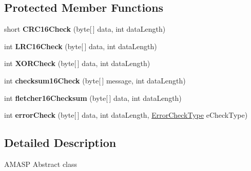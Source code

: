 \subsection*{Protected Member Functions}
\begin{DoxyCompactItemize}
\item 
\mbox{\label{class_a_m_a_s_p_java_1_1_a_m_a_s_p_serial_aaf3f716e38e188729ef100eb98cc7645}} 
short {\bfseries C\+R\+C16\+Check} (byte\mbox{[}$\,$\mbox{]} data, int data\+Length)
\item 
\mbox{\label{class_a_m_a_s_p_java_1_1_a_m_a_s_p_serial_a72d99f11d341894f00db3ec83a7ae1c4}} 
int {\bfseries L\+R\+C16\+Check} (byte\mbox{[}$\,$\mbox{]} data, int data\+Length)
\item 
\mbox{\label{class_a_m_a_s_p_java_1_1_a_m_a_s_p_serial_a103194de2441c8ff4e62bfbd003f1555}} 
int {\bfseries X\+O\+R\+Check} (byte\mbox{[}$\,$\mbox{]} data, int data\+Length)
\item 
\mbox{\label{class_a_m_a_s_p_java_1_1_a_m_a_s_p_serial_a445ac68f830d47a8ce8d72c27f83c05d}} 
int {\bfseries checksum16\+Check} (byte\mbox{[}$\,$\mbox{]} message, int data\+Length)
\item 
\mbox{\label{class_a_m_a_s_p_java_1_1_a_m_a_s_p_serial_a57e1d54c03292c4aff5bcf58b55bf776}} 
int {\bfseries fletcher16\+Checksum} (byte\mbox{[}$\,$\mbox{]} data, int data\+Length)
\item 
\mbox{\label{class_a_m_a_s_p_java_1_1_a_m_a_s_p_serial_a1f07c055ad8f6795df140a1a8f30030d}} 
int {\bfseries error\+Check} (byte\mbox{[}$\,$\mbox{]} data, int data\+Length, \hyperlink{enum_a_m_a_s_p_java_1_1_a_m_a_s_p_serial_1_1_error_check_type}{Error\+Check\+Type} e\+Check\+Type)
\end{DoxyCompactItemize}


\subsection{Detailed Description}
A\+M\+A\+SP Abstract class

